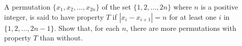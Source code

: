 A permutation $ \{x_1, x_2, \ldots, x_{2n}\}$ of the set $ \{1,2, \ldots, 2n\}$ where $ n$ is a positive integer, is said to have property $ T$ if $ |x_i - x_{i + 1}| = n$ for at least one $ i$ in $ \{1,2, \ldots, 2n - 1\}.$ Show that, for each $ n$,  there are more permutations with property $ T$ than without.